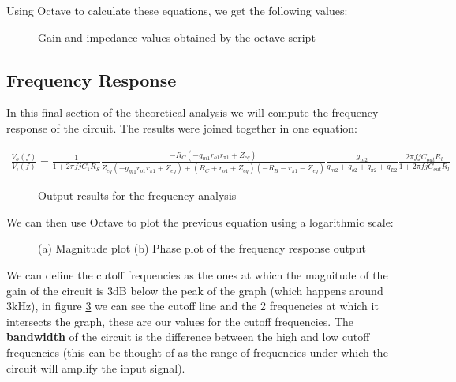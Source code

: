 Using Octave to calculate these equations, we get the following values:
\vspace{15pt}

\begin{figure}[h]
	\centering
	
	\caption{Gain and impedance values obtained by the octave script}
	\label{fig:results_th}
\end{figure}

\vspace{15pt}


\vspace{15pt}

\subsection{Frequency Response}

In this final section of the theoretical analysis we will compute the frequency response of the circuit. The results were joined together in one equation:
\vspace{15pt}

\fontsize{8pt}{12pt}\selectfont
\begin{gather}
    	\frac{V_o(f)}{V_i(f)}=\frac{1}{1+2\pi fjC_1R_S}\frac{-R_C(-g_{m1}r_{o1}r_{\pi 1}+Z_{eq})}{Z_{eq}(-g_{m1}r_{o1}r_{\pi 1}+Z_{eq})+(R_C+r_{o1}+Z_{eq})(-R_B-r_{\pi 1}-Z_{eq})}\frac{g_{m2}}{g_{m2}+g_{o2}+g_{\pi 2}+g_{E2}}\frac{2\pi fjC_{out}R_l}{1+2\pi fjC_{out}R_l} \nonumber
\end{gather}
\normalsize

\begin{figure}[h]
	\centering
	
	\caption{Output results for the frequency analysis}
	\label{fig:output_th}
\end{figure}

\pagebreak

We can then use Octave to plot the previous equation using a logarithmic scale:

\begin{figure}[h!]
	\centering
	\caption{(a) Magnitude plot (b) Phase plot of the frequency response output}
	\label{fig:freq_th}
\end{figure}

We can define the cutoff frequencies as the ones at which the magnitude of the gain of the circuit is 3dB below the peak of the graph (which happens around 3kHz), in figure \ref{fig:freq_th} we can see the cutoff line and the 2 frequencies at which it intersects the graph, these are our values for the cutoff frequencies. The \textbf{bandwidth} of the circuit is the difference between the high and low cutoff frequencies (this can be thought of as the range of frequencies under which the circuit will amplify the input signal).

